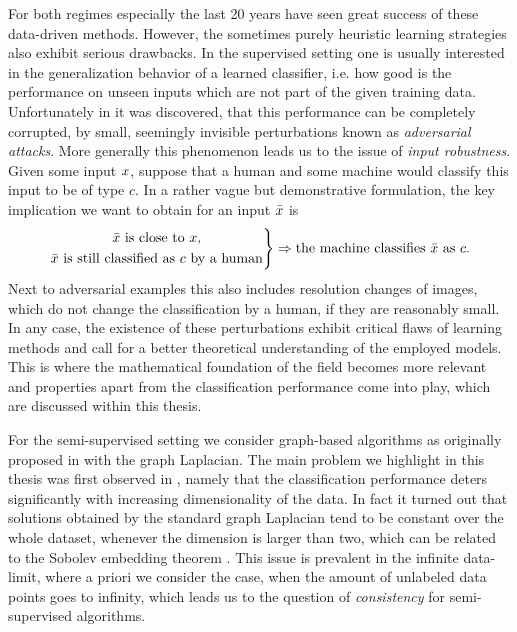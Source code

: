 For both regimes especially the last 20 years have seen great success of these data-driven methods. However, the sometimes purely heuristic learning strategies also exhibit serious drawbacks. In the supervised setting one is usually interested in the generalization behavior of a learned classifier, i.e. how good is the performance on unseen inputs which are not part of the given training data. Unfortunately in \cite{goodfellow2014explaining} it was discovered, that this performance can be completely corrupted, by small, seemingly invisible perturbations known as \textit{adversarial attacks}. More generally this phenomenon leads us to the issue of \textit{input robustness}. Given some input $x$, suppose that a human and some machine would classify this input to be of type $c$. In a rather vague but demonstrative formulation, the key implication we want to obtain for an input $\bar{x}$ is
%
\begin{align*}
\left.
\begin{gathered}
\bar{x}\text{ is close to }x,\\
\bar{x}\text{ is still classified as }c\text{ by a human}
\end{gathered}
\right\}
\Rightarrow
\text{the machine classifies }\bar{x}\text{ as } c. 
\end{align*}
%
Next to adversarial examples this also includes resolution changes of images, which do not change the classification by a human, if they are reasonably small. In any case, the existence of these perturbations exhibit critical flaws of learning methods and call for a better theoretical understanding of the employed models. This is where the mathematical foundation of the field becomes more relevant and properties apart from the classification performance come into play, which are discussed within this thesis.

For the semi-supervised setting we consider graph-based algorithms as originally proposed in \cite{zhu2003semi} with the graph Laplacian. The main problem we highlight in this thesis was first observed in \cite{nadler2009statistical}, namely that the classification performance deters significantly with increasing dimensionality of the data. In fact it turned out that solutions obtained by the standard graph Laplacian tend to be constant over the whole dataset, whenever the dimension is larger than two, which can be related to the Sobolev embedding theorem \cite{adams2003sobolev}. This issue is prevalent in the infinite data-limit, where a priori we consider the case, when the amount of unlabeled data points goes to infinity, which leads us to the question of \textit{consistency} for semi-supervised algorithms.

